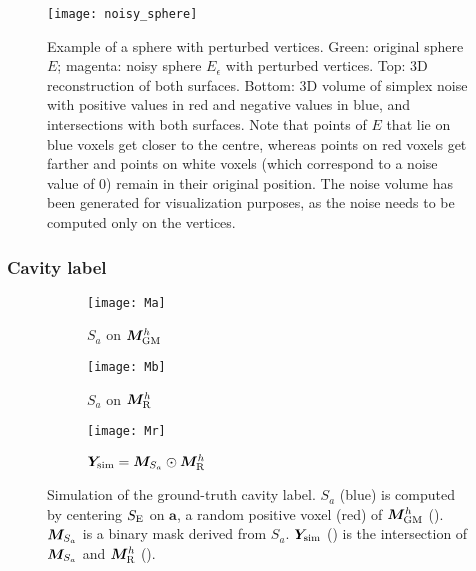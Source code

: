 \begin{figure}
  \centering
  \texttt{[image: noisy\_sphere]}
  \caption[Example of a sphere with perturbed vertices]{
    Example of a sphere with perturbed vertices.
    Green: original sphere $E$;
    magenta: noisy sphere $E_\epsilon$ with perturbed vertices.
    Top: 3D reconstruction of both surfaces.
    Bottom: 3D volume of simplex noise with positive values in red and negative values in blue, and intersections with both surfaces.
    Note that points of $E$ that lie on blue voxels get closer to the centre, whereas points on red voxels get farther and points on white voxels (which correspond to a noise value of 0) remain in their original position.
    The noise volume has been generated for visualization purposes, as the noise needs to be computed only on the vertices.}
  \label{fig:noisy_sphere}
\end{figure}


\subsubsection{Cavity label}
\label{sec:cavity_constrain}


\begin{figure}
  \centering
  \begin{subfigure}{0.3\textwidth}
    \texttt{[image: Ma]}
    \caption{$S_a$ on $\bm{M}_{\text{GM}}^h$\label{fig:sama}}
  \end{subfigure}
  \begin{subfigure}{0.3\textwidth}
    \texttt{[image: Mb]}
    \caption{$S_a$ on $\bm{M}_{\text{R}}^h$\label{fig:samb}}
  \end{subfigure}
  \begin{subfigure}{0.3\textwidth}
    \texttt{[image: Mr]}
    \caption{$\bm{Y}_{\text{sim}} = \bm{M}_{S_a} \odot \bm{M}_{\text{R}}^h$\label{fig:mr}}
  \end{subfigure}

  \caption[Simulation of the ground-truth cavity label]{
    Simulation of the ground-truth cavity label.
    $S_a$ (blue) is computed by centering $S_{\text{E}}$ on $\bm{a}$, a random positive voxel (red) of $\bm{M}_{\text{GM}}^h$ ().
    $\bm{M}_{S_a}$ is a binary mask derived from $S_a$.
    $\bm{Y}_{\text{sim}}$ () is the intersection of $\bm{M}_{S_a}$ and $\bm{M}_{\text{R}}^h$ ().
  }
  \label{fig:shape}
\end{figure}



